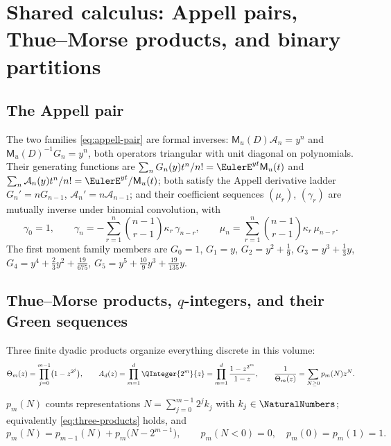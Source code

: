 \documentclass[11pt,oneside]{article}
\numberwithin{equation}{section}
\theoremstyle{definition}
\theoremstyle{remark}
\newcommand{\ThetaTM}{\Theta}
\newcommand{\MM}{\mathsf M}
\newcommand{\Gd}{\mathcal A}
\begin{document}
\section{Shared calculus: Appell pairs, Thue--Morse products, and
binary partitions}
\label{sec:shared}

\subsection{The Appell pair}

The two families \eqref{eq:appell-pair} are formal inverses:
$\MM_u(D)\Gd_n=y^{n}$ and $\MM_u(D)^{-1}G_n=y^{n}$, both operators
triangular with unit diagonal on polynomials.  Their generating
functions are
$\sum_nG_n(y)t^{n}/n!=\EulerE^{yt}\MM_u(t)$ and
$\sum_n\Gd_n(y)t^{n}/n!=\EulerE^{yt}/\MM_u(t)$; both satisfy the Appell
derivative ladder $G_n'=nG_{n-1}$, $\Gd_n'=n\Gd_{n-1}$; and their
coefficient sequences $(\mu_r)$, $(\gamma_r)$ are mutually inverse
under binomial convolution, with
\begin{equation}
 \gamma_0=1,\qquad
 \gamma_n=-\sum_{r=1}^{n}\binom{n-1}{r-1}\kappa_r\,\gamma_{n-r},
 \qquad
 \mu_n=\sum_{r=1}^{n}\binom{n-1}{r-1}\kappa_r\,\mu_{n-r}.
 \label{eq:gamma-mu-recurrences}
\end{equation}
The first moment family members are $G_0=1$, $G_1=y$,
$G_2=y^{2}+\tfrac19$, $G_3=y^{3}+\tfrac13y$,
$G_4=y^{4}+\tfrac23y^{2}+\tfrac{19}{675}$,
$G_5=y^{5}+\tfrac{10}9y^{3}+\tfrac{19}{135}y$.

\subsection{Thue--Morse products, \texorpdfstring{$q$}{q}-integers, and their Green
sequences}

Three finite dyadic products organize everything discrete in this
volume:
\begin{equation}
 \ThetaTM_m(z)=\prod_{j=0}^{m-1}\bigl(1-z^{2^{j}}\bigr),
 \qquad
 A_d(z)=\prod_{m=1}^{d}\QInteger{2^{m}}{z}
 =\prod_{m=1}^{d}\frac{1-z^{2^{m}}}{1-z},
 \qquad
 \frac{1}{\ThetaTM_m(z)}=\sum_{N\ge0}p_m(N)z^{N}.
 \label{eq:three-products}
\end{equation}

\begin{definition}
\label{def:pm}
$p_m(N)$ counts representations $N=\sum_{j=0}^{m-1}2^{j}k_j$ with
$k_j\in\NaturalNumbers$; equivalently \eqref{eq:three-products} holds, and
\begin{equation}
 p_m(N)=p_{m-1}(N)+p_m\bigl(N-2^{m-1}\bigr),
 \qquad p_m(N<0)=0,\quad p_m(0)=p_m(1)=1.
 \label{eq:pm-def}
\end{equation}
\end{definition}
\end{document}
